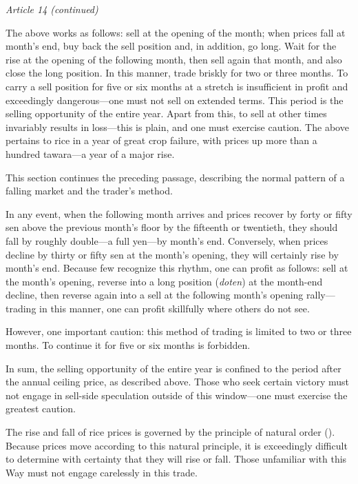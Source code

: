 \begin{sokyubox}
{\small\itshape\color{sokyubar} Article 14 (continued)}

\medskip
The above works as follows: sell at the opening of the month; when
prices fall at month's end, buy back the sell position and, in addition,
go long. Wait for the rise at the opening of the following month, then
sell again that month, and also close the long position. In this manner,
trade briskly for two or three months. To carry a sell position for five
or six months at a stretch is insufficient in profit and exceedingly
dangerous---one must not sell on extended terms. This period is the
selling opportunity of the entire year. Apart from this, to sell at other
times invariably results in loss---this is plain, and one must exercise
caution. The above pertains to rice in a year of great crop failure, with
prices up more than a hundred tawara---a year of a major rise.
\end{sokyubox}

\commentary
This section continues the preceding passage, describing the normal
pattern of a falling market and the trader's method.

In any event, when the following month arrives and prices recover by
forty or fifty sen above the previous month's floor by the fifteenth or
twentieth, they should fall by roughly double---a full yen---by month's
end. Conversely, when prices decline by thirty or fifty sen at the
month's opening, they will certainly rise by month's end. Because few
recognize this rhythm, one can profit as follows: sell at the month's
opening, reverse into a long position (\textit{doten}) at the month-end
decline, then reverse again into a sell at the following month's opening
rally---trading in this manner, one can profit skillfully where others do
not see.

However, one important caution: this method of trading is limited to two
or three months. To continue it for five or six months is forbidden.

In sum, the selling opportunity of the entire year is confined to the
period after the annual ceiling price, as described above. Those who seek
certain victory must not engage in sell-side speculation outside of this
window---one must exercise the greatest caution.


\begin{sokyubox}
{\small\itshape\color{sokyubar} }

\medskip
The rise and fall of rice prices is governed by the principle of natural
order (). Because prices move according to
this natural principle, it is exceedingly difficult to determine with
certainty that they will rise or fall. Those unfamiliar with this Way
must not engage carelessly in this trade.
\end{sokyubox}

